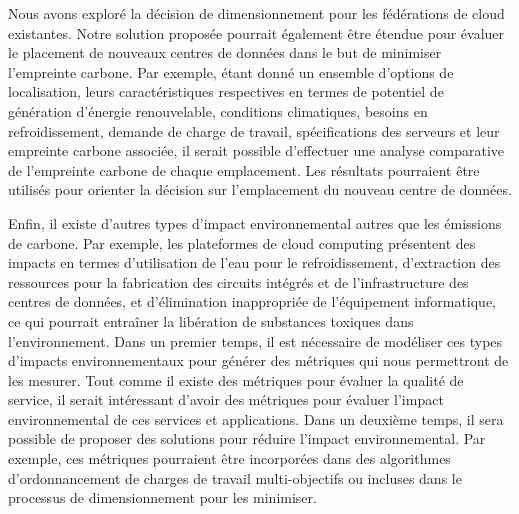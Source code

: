 Nous avons exploré la décision de dimensionnement pour les fédérations de cloud existantes. Notre solution proposée pourrait également être étendue pour évaluer le placement de nouveaux centres de données dans le but de minimiser l'empreinte carbone. Par exemple, étant donné un ensemble d'options de localisation, leurs caractéristiques respectives en termes de potentiel de génération d'énergie renouvelable, conditions climatiques, besoins en refroidissement, demande de charge de travail, spécifications des serveurs et leur empreinte carbone associée, il serait possible d'effectuer une analyse comparative de l'empreinte carbone de chaque emplacement. Les résultats pourraient être utilisés pour orienter la décision sur l'emplacement du nouveau centre de données.


Enfin, il existe d'autres types d'impact environnemental autres que les émissions de carbone. Par exemple, les plateformes de cloud computing présentent des impacts en termes d'utilisation de l'eau pour le refroidissement, d'extraction des ressources pour la fabrication des circuits intégrés et de l'infrastructure des centres de données, et d'élimination inappropriée de l'équipement informatique, ce qui pourrait entraîner la libération de substances toxiques dans l'environnement. Dans un premier temps, il est nécessaire de modéliser ces types d'impacts environnementaux pour générer des métriques qui nous permettront de les mesurer. Tout comme il existe des métriques pour évaluer la qualité de service, il serait intéressant d'avoir des métriques pour évaluer l'impact environnemental de ces services et applications. Dans un deuxième temps, il sera possible de proposer des solutions pour réduire l'impact environnemental. Par exemple, ces métriques pourraient être incorporées dans des algorithmes d'ordonnancement de charges de travail multi-objectifs ou incluses dans le processus de dimensionnement pour les minimiser.


